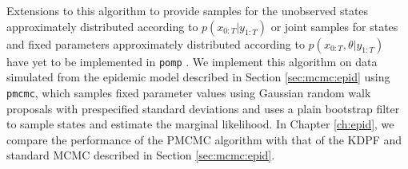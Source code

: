 Extensions to this algorithm to provide samples for the unobserved states approximately distributed according to $p(x_{0:T}|y_{1:T})$ or joint samples for states and fixed parameters approximately distributed according to $p(x_{0:T},\theta|y_{1:T})$ have yet to be implemented in {\tt pomp} \cite[see Section 2.4.3][]{Andr:Douc:Hol:pmcmc:2010}. We implement this algorithm on data simulated from the epidemic model described in Section \ref{sec:mcmc:epid} using {\tt pmcmc}, which samples fixed parameter values using Gaussian random walk proposals with prespecified standard deviations and uses a plain bootstrap filter to sample states and estimate the marginal likelihood. In Chapter \ref{ch:epid}, we compare the performance of the PMCMC algorithm with that of the KDPF and standard MCMC described in Section \ref{sec:mcmc:epid}. 